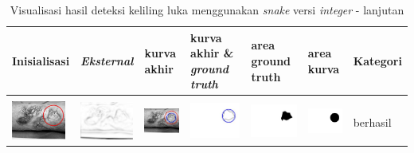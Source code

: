 \begin{table}[H]
	\centering
	\caption{Visualisasi hasil deteksi keliling luka menggunakan \emph{snake} versi \emph{integer} - lanjutan}
	\label{tabel_hasil_4}
	\begin{tabular}{|m{0.7in}|m{0.7in}|m{0.7in}|m{0.7in}|m{0.7in}|m{0.7in}|m{0.7in}|}
		\hline
		\textbf{Inisialisasi} & \textbf{\emph{Eksternal}} & \textbf{kurva akhir} & \textbf{kurva akhir \& \emph{ground truth}}& \textbf{area ground truth} & \textbf{area kurva} & \textbf{Kategori} \\
		\hline
		
		&  &  & & & &  \\
		\includegraphics[width=0.7in]{dataset/dataset_3/luka_kuning/ready/13_integer_init.jpg}&
		\includegraphics[width=0.7in]{dataset/dataset_3/luka_kuning/ready/13_integer_ext.jpg}&
		\includegraphics[width=0.7in]{dataset/dataset_3/luka_kuning/ready/13_integer_result.jpg}&
		\includegraphics[width=0.7in]{dataset/dataset_3/luka_kuning/ready/13_gt_r_integer.jpg}&
		\includegraphics[width=0.7in]{dataset/dataset_3/luka_kuning/ready/13_r.jpg}&
		\includegraphics[width=0.7in]{dataset/dataset_3/luka_kuning/ready/13_integer_r.jpg}&
		berhasil\\
		\hline
		

\end{tabular}
\end{table}
